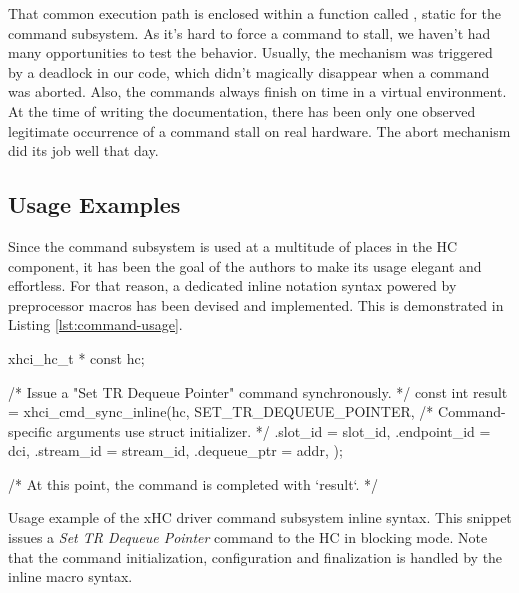 That common execution path is enclosed within a function called
, static for the command subsystem. As it's hard
to force a command to stall, we haven't had many opportunities to test the
behavior. Usually, the mechanism was triggered by a deadlock in our code, which
didn't magically disappear when a command was aborted. Also, the commands
always finish on time in a virtual environment. At the time of writing the
documentation, there has been only one observed legitimate occurrence of
a command stall on real hardware. The abort mechanism did its job well that day.

\subsection{Usage Examples}

Since the command subsystem is used at a multitude of places in the HC
component, it has been the goal of the authors to make its usage elegant and
effortless. For that reason, a dedicated inline notation syntax powered by
preprocessor macros has been devised and implemented. This is demonstrated in
Listing \ref{lst:command-usage}.

\begin{listing}[h]
	\begin{code}
		xhci_hc_t * const hc;

		/* Issue a "Set TR Dequeue Pointer" command synchronously. */
		const int result = xhci_cmd_sync_inline(hc, SET_TR_DEQUEUE_POINTER,
		    /* Command-specific arguments use struct initializer. */
		    .slot_id = slot_id,
		    .endpoint_id = dci,
		    .stream_id = stream_id,
		    .dequeue_ptr = addr,
		);

		/* At this point, the command is completed with `result`. */
	\end{code}
	\caption[Usage example of xHC driver inline command syntax.]{Usage example
	of the xHC driver command subsystem inline  syntax. This snippet issues a
	\textit{Set TR Dequeue Pointer} command to the HC in blocking mode. Note
	that the command initialization, configuration and finalization is handled
	by the inline macro syntax.}
	\label{lst:command-usage}
\end{listing}

